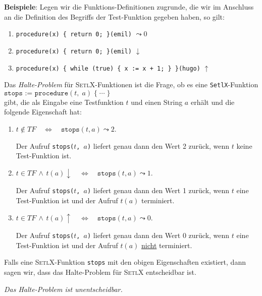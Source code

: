 \noindent
\textbf{Beispiele}: Legen wir die Funktions-Definitionen zugrunde, die wir im Anschluss an
die Definition des Begriffs der Test-Funktion gegeben haben, so gilt:
\begin{enumerate}
\item {\tt procedure(x) \{ return 0; \}(emil)} $\leadsto 0$
\item {\tt procedure(x) \{ return 0; \}(emil)} $\downarrow$
\item {\tt procedure(x) \{ while (true) \{ x := x + 1; \} \}(hugo)} $\uparrow$
\end{enumerate} 

\noindent
Das \emph{Halte-Problem} f\"{u}r
\textsc{SetlX}-Funktionen ist die Frage, ob es eine \texttt{SetlX}-Funktion \\[0.1cm] 
\hspace*{1.3cm} 
$\texttt{stops := procedure}(t,\;a)\; \{\;\cdots\;\}$ \\[0.1cm]
gibt, die als Eingabe eine Testfunktion $t$ und einen String $a$ erh\"{a}lt und die folgende
Eigenschaft hat:
\begin{enumerate}
\item $t \not\in T\!F \quad\Leftrightarrow\quad \mathtt{stops}(t, a) \leadsto 2$.

      Der Aufruf \texttt{stops($t$, $a$)} liefert genau dann den Wert 2 zur\"{u}ck, 
      wenn $t$ keine Test-Funktion ist.

\item $t \in T\!F \,\wedge\, t(a)\downarrow \quad\Leftrightarrow\quad
       \mathtt{stops}(t, a) \leadsto 1$.

      Der Aufruf \texttt{stops($t$, $a$)} liefert genau dann den Wert 1 zur\"{u}ck,
      wenn $t$ eine Test-Funktion ist und der Aufruf $t(a)$ terminiert.

\item $t \in T\!F \,\wedge\, t(a)\uparrow \quad\Leftrightarrow\quad
       \mathtt{stops}(t, a) \leadsto 0$.

      Der Aufruf \texttt{stops($t$, $a$)} liefert genau dann den Wert 0 zur\"{u}ck,
      wenn $t$ eine Test-Funktion ist und der Aufruf $t(a)$ \underline{nicht} terminiert.
\end{enumerate}
Falls eine \textsc{SetlX}-Funktion \texttt{stops} mit den obigen Eigenschaften existiert, dann
sagen wir, dass das Halte-Problem f\"{u}r \textsc{SetlX} entscheidbar ist.

\begin{Theorem}
{\em
  Das Halte-Problem ist unentscheidbar.
} 
\end{Theorem}

